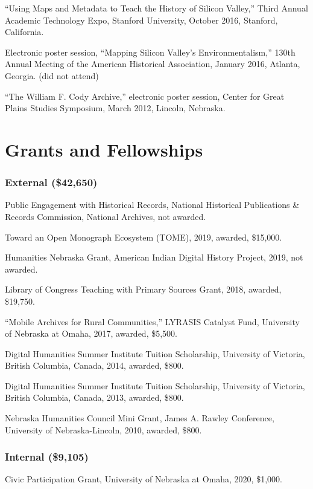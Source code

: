``Using Maps and Metadata to Teach the History of Silicon Valley,''
Third Annual Academic Technology Expo, Stanford University, October
2016, Stanford, California.

Electronic poster session, ``Mapping Silicon Valley's
Environmentalism,'' 130th Annual Meeting of the American Historical
Association, January 2016, Atlanta, Georgia. (did not attend)

``The William F. Cody Archive,'' electronic poster session, Center for
Great Plains Studies Symposium, March 2012, Lincoln, Nebraska.

\section{Grants and Fellowships}\label{grants-and-fellowships}

\subsubsection{External (\$42,650)}\label{external-42650}

Public Engagement with Historical Records, National Historical
Publications \& Records Commission, National Archives, not awarded.

Toward an Open Monograph Ecosystem (TOME), 2019, awarded, \$15,000.

Humanities Nebraska Grant, American Indian Digital History Project,
2019, not awarded.

Library of Congress Teaching with Primary Sources Grant, 2018, awarded,
\$19,750.

``Mobile Archives for Rural Communities,'' LYRASIS Catalyst Fund,
University of Nebraska at Omaha, 2017, awarded, \$5,500.

Digital Humanities Summer Institute Tuition Scholarship, University of
Victoria, British Columbia, Canada, 2014, awarded, \$800.

Digital Humanities Summer Institute Tuition Scholarship, University of
Victoria, British Columbia, Canada, 2013, awarded, \$800.

Nebraska Humanities Council Mini Grant, James A. Rawley Conference,
University of Nebraska-Lincoln, 2010, awarded, \$800.

\subsubsection{Internal (\$9,105)}\label{internal-9105}

Civic Participation Grant, University of Nebraska at Omaha, 2020,
\$1,000.


